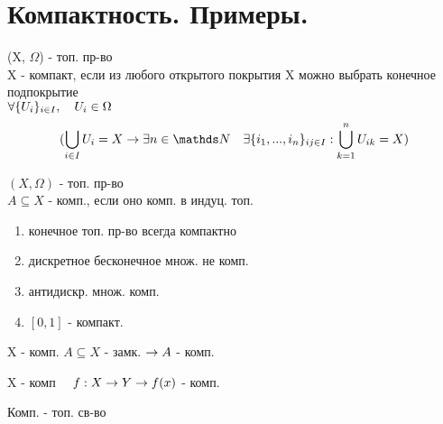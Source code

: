 \documentclass[geometry.tex]{subfiles}
\begin{document}
  \section{Компактность. Примеры.}

  \begin{definition}
      (X, $\Omega$) - топ. пр-во\\
      X - компакт, если из любого открытого покрытия X можно выбрать конечное подпокрытие\\
      $\forall \{U_i\}_{i \in I},\quad U_i \in \Omega$\\
      \[(\bigcup_{i \in I}U_i = X \ra \exists n \in \N \q \exists \{i_1, ..., i_n\}_{ij \in I}:
      \bigcup_{k = 1}^n U_{ik} = X)\]
  \end{definition}

  \begin{definition}
      $(X, \Omega)$ - топ. пр-во\\
      $A \subseteq X$ - комп., если оно комп. в индуц. топ.
  \end{definition}

  \begin{theorem}
      \begin{enumerate}
          \item конечное топ. пр-во всегда компактно
          \item дискретное бесконечное множ. не комп.
          \item антидискр. множ. комп.
          \item  $[0, 1]$ - компакт.
      \end{enumerate}
  \end{theorem}

  \begin{theorem}
      X - комп. $A \subseteq X$ - замк. $\rightarrow A$ - комп.
  \end{theorem}

  \begin{theorem}
      X - комп $\quad f:X \rightarrow Y \rightarrow f(x)$ - комп.
  \end{theorem}

  \begin{consequence}
      Комп. - топ. св-во
  \end{consequence}
\end{document}
